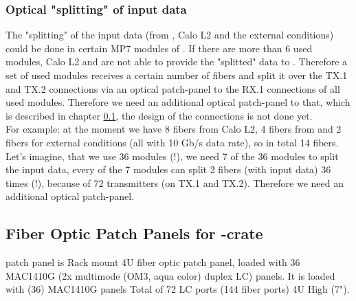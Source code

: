 %


\clearpage



\subsubsection{Optical "splitting" of \ugt input data}\label{sec:gtl:optical_spliting_input_data}
The "splitting" of the \ugt input data (from \ugmt, Calo L2 and the external conditions) could be done in certain MP7 modules of \ugt. If there are more than 6 used \ugt modules,
Calo L2 and \ugmt are not able to provide the "splitted" data to \ugt. Therefore a set of used \ugt modules receives a certain number of fibers and split it over the TX.1 and TX.2 connections
via an optical patch-panel to the RX.1 connections of all used \ugt modules. Therefore we need an additional optical patch-panel to that, which is described in chapter \ref{sec:com-hard:fiber_optic_patch_gt_crate},
the design of the connections is not done yet.\\
For example: at the moment we have 8 fibers from Calo L2, 4 fibers from \ugmt and 2 fibers for external conditions (all with 10 Gb/s data rate), so in total 14 fibers.
Let's imagine, that we use 36 \ugt modules (!), we need 7 of the 36 modules to split the \ugt input data, every of the 7 modules can split 2 fibers (with input data) 36 times (!),
because of 72 transmitters (on TX.1 and TX.2). Therefore we need an additional optical patch-panel.

\subsection{Fiber Optic Patch Panels for \ugt-crate}\label{sec:com-hard:fiber_optic_patch_gt_crate}

\ugt patch panel is Rack mount 4U fiber optic patch panel, loaded with 36 MAC1410G (2x multimode (OM3, aqua color) duplex LC) panels.
It is loaded with (36) MAC1410G panels Total of 72 LC ports (144 fiber ports) 4U High (7").

